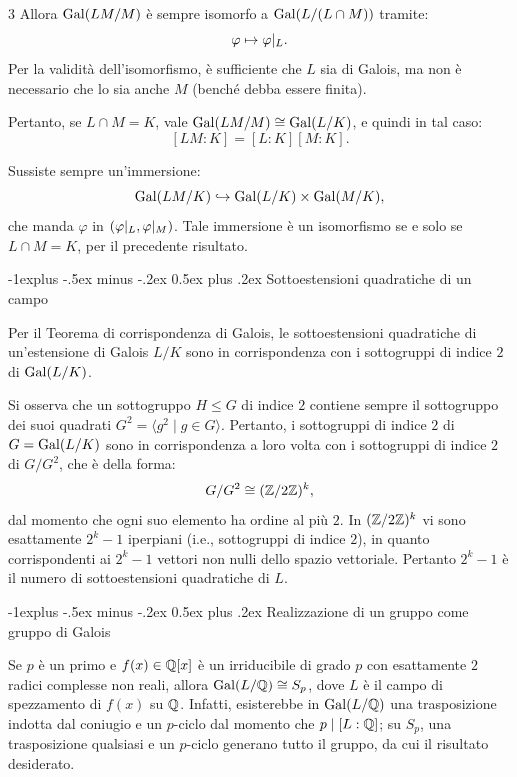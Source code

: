 \documentclass[10pt,landscape]{article}
\makeatletter
\renewcommand{\subsection}{\@startsection{subsection}{2}{0mm}%
	{-1explus -.5ex minus -.2ex}%
	{0.5ex plus .2ex}%
	{\normalfont\normalsize\bfseries}}
\makeatother
\begin{document}
\begin{multicols}{3}
	Allora $\operatorname{Gal}(LM/M)$ è sempre isomorfo a $\operatorname{Gal}(L/(L \cap M))$ tramite:
	\[
		\varphi \mapsto \varphi\arrowvert_{L}.
	\]
	Per la validità dell'isomorfismo, è sufficiente che $L$ sia di Galois, ma non
	è necessario che lo sia anche $M$ (benché debba essere finita). \smallskip

	Pertanto, se $L \cap M = K$, vale $\operatorname{Gal}(LM/M) \cong \operatorname{Gal}(L/K)$, e quindi
	in tal caso:
	\[
		[LM : K] = [L : K] [M : K].
	\]

	Sussiste sempre un'immersione:
	\[
		\operatorname{Gal}(LM/K) \hookrightarrow \operatorname{Gal}(L/K) \times \operatorname{Gal}(M/K),
	\]
	che manda $\varphi$ in $(\varphi\arrowvert_{L}, \varphi\arrowvert_{M})$. Tale
	immersione è un isomorfismo se e solo se $L \cap M = K$, per il precedente
	risultato.

	\subsection{Sottoestensioni quadratiche di un campo}

	Per il Teorema di corrispondenza di Galois, le sottoestensioni quadratiche di un'estensione
	di Galois $L/K$ sono in corrispondenza con i sottogruppi di indice $2$ di
	$\operatorname{Gal}(L/K)$. \smallskip

	Si osserva che un sottogruppo $H \leq G$ di indice $2$ contiene
	sempre il sottogruppo dei suoi quadrati $G^2 = \langle g^2 \mid g \in G \rangle$.
	Pertanto, i sottogruppi di indice $2$ di $G = \operatorname{Gal}(L/K)$ sono in corrispondenza a
	loro volta con i sottogruppi di indice $2$ di $G / G^2$, che è della forma:
	\[
		G/G^2 \cong (\mathbb Z / 2 \mathbb Z)^k,
	\]
	dal momento che ogni suo elemento ha ordine al più $2$. In $(\mathbb Z / 2 \mathbb Z)^k$
	vi sono esattamente $2^k-1$ iperpiani (i.e., sottogruppi di indice $2$), in
	quanto corrispondenti ai $2^k-1$ vettori non nulli dello spazio vettoriale. Pertanto
	$2^k-1$ è il numero di sottoestensioni quadratiche di $L$.

	\subsection{Realizzazione di un gruppo come gruppo di Galois}

	Se $p$ è un primo e $f(x) \in \mathbb Q[x]$ è un irriducibile di grado $p$ con esattamente
	$2$ radici complesse non reali, allora $\operatorname{Gal}(L/\mathbb Q) \cong S_p$, dove $L$ è il
	campo di spezzamento di $f(x)$ su $\mathbb Q$. Infatti, esisterebbe
	in $\operatorname{Gal}(L/\mathbb Q)$ una trasposizione indotta dal coniugio e un $p$-ciclo dal momento che
	$p \mid [L : \mathbb Q]$; su $S_p$, una trasposizione qualsiasi e un $p$-ciclo generano tutto
	il gruppo, da cui il risultato desiderato. \smallskip


\end{multicols}
\end{document}
